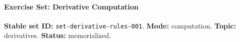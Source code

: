
\paragraph{Exercise Set: Derivative Computation}
\textbf{Stable set ID:} \texttt{set-derivative-rules-001}.
\textbf{Mode:} computation.
\textbf{Topic:} derivatives.
\textbf{Status:} memorialized.


